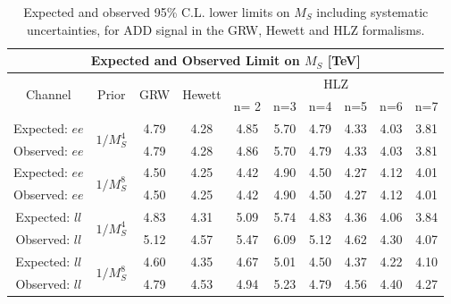 \begin{table}[]
  \begin{center}
    \begin{tabular}{c|c|c|c|cccccc}
        \hline
        \hline
        \multicolumn{10}{c}{Expected and Observed Limit on $M_{S}$ [TeV]} \\
        \hline
        \multirow{2}{*}{Channel} & \multirow{2}{*}{Prior} & \multirow{2}{*}{GRW} & \multirow{2}{*}{Hewett} & \multicolumn{6}{c}{HLZ} \\
        \cline{5-10}
                &       &     &        & n= 2 &  n=3 & n=4 & n=5 & n=6 & n=7 \\
        \hline
        \hline
        Expected: $ee$      & \multirow{2}{*}{$1/M_{S}^{4}$} & 4.79 & 4.28 & 4.85 & 5.70 & 4.79 & 4.33 & 4.03 & 3.81 \\
        Observed: $ee$      &  & 4.79 & 4.28 & 4.86 & 5.70 & 4.79 & 4.33 & 4.03 & 3.81 \\
        \hline
        Expected: $ee$      & \multirow{2}{*}{$1/M_{S}^{8}$} & 4.50 & 4.25 & 4.42 & 4.90 & 4.50 & 4.27 & 4.12 & 4.01 \\
        Observed: $ee$      &  & 4.50 & 4.25 & 4.42 & 4.90 & 4.50 & 4.27 & 4.12 & 4.01 \\
        \hline
        \hline
        Expected: $ll$      & \multirow{2}{*}{$1/M_{S}^{4}$} & 4.83 & 4.31 & 5.09 & 5.74 & 4.83 & 4.36 & 4.06 & 3.84 \\
        Observed: $ll$      &  & 5.12 & 4.57 & 5.47 & 6.09 & 5.12 & 4.62 & 4.30 & 4.07 \\
        \hline
        Expected: $ll$      & \multirow{2}{*}{$1/M_{S}^{8}$} & 4.60 & 4.35 & 4.67 & 5.01 & 4.50 & 4.37 & 4.22 & 4.10 \\
        Observed: $ll$      &  & 4.79 & 4.53 & 4.94 & 5.23 & 4.79 & 4.56 & 4.40 & 4.27 \\
        \hline
        \hline
    \end{tabular}
  \end{center}
    \caption{Expected and observed 95\% C.L. lower limits on $M_{S}$ including systematic uncertainties, for ADD signal in the GRW, Hewett and HLZ formalisms.
    \label{tab:ADD_results_formalisms}}
\end{table}



